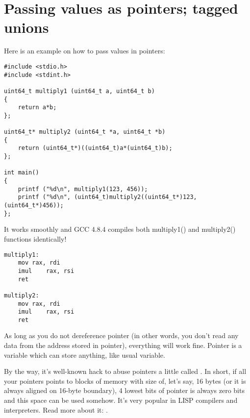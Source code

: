 \section{Passing values as pointers; tagged unions}

Here is an example on how to pass values in pointers:

\begin{lstlisting}
#include <stdio.h>
#include <stdint.h>

uint64_t multiply1 (uint64_t a, uint64_t b)
{
	return a*b;
};

uint64_t* multiply2 (uint64_t *a, uint64_t *b)
{
	return (uint64_t*)((uint64_t)a*(uint64_t)b);
};

int main()
{
	printf ("%d\n", multiply1(123, 456));
	printf ("%d\n", (uint64_t)multiply2((uint64_t*)123, (uint64_t*)456));
};
\end{lstlisting}

It works smoothly and GCC 4.8.4 compiles both multiply1() and multiply2() functions identically!

\begin{lstlisting}
multiply1:
	mov	rax, rdi
	imul	rax, rsi
	ret

multiply2:
	mov	rax, rdi
	imul	rax, rsi
	ret
\end{lstlisting}

As long as you do not dereference pointer (in other words, you don't read any data from the address stored in pointer), everything will work fine.
Pointer is a variable which can store anything, like usual variable.


By the way, it's well-known hack to abuse pointers a little called .
In short, if all your pointers points to blocks of memory with size of, let's say, 16 bytes (or it is always aligned on 16-byte boundary), 4 lowest bits of pointer is always zero bits and this space
can be used somehow.
It's very popular in LISP compilers and interpreters.
Read more about it: \cite[1.3]{CBook}.


